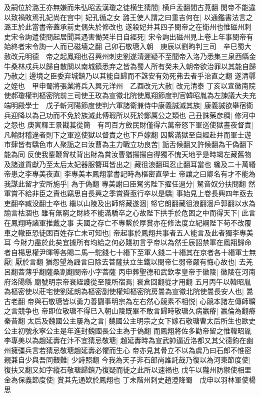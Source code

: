 及嗣位於潞王亦無嫌而朱弘昭孟漢瓊之徒横生猜間|{
	横戶孟翻間古莧翻}
閔帝不能違以致禍敗焉孔妃尚在宫中|{
	妃孔循之女}
潞王使人謂之曰重吉何在|{
	以通鑑書法言之潞王於此當書帝蓋承前史偶失於修改也}
遂殺妃并其四子閔帝之在衛州也惟磁州刺史宋令詢遣使問起居聞其遇害慟哭半日自經死|{
	宋令詢出磁州見上卷上年事閔帝有始終者宋令詢一人而已磁墻之翻}
己卯石敬瑭入朝　庚辰以劉昫判三司　辛巳蜀大赦改元明德　帝之起鳳翔也召興州刺史劉遂清遲疑不至聞帝入洛乃悉集三泉西縣金牛桑林戍兵以歸自散關以南城鎮悉弃之皆為蜀人所有癸未入朝帝欲治罪以其能自歸乃赦之|{
	邊境之臣委弃城鎮乃以其能自歸而不誅安有効死弗去者乎治直之翻}
遂清鄩之姪也　甲申蜀將張業將兵入興元洋州　乙酉改元大赦|{
	改元清泰}
丁亥以宣徽南院使郝瓊權判樞密院前三司使王玫為宣徽北院使鳳翔節度判官韓昭胤為左諫議大夫充端明殿學士　戊子斬河陽節度使判六軍諸衛兼侍中康義誠滅其族|{
	康義誠欲舉宿衛兵迎降以為己功而不免於族滅此傅瑕所以死於鄭厲公之類也}
己丑誅藥彦稠|{
	修河中之怨也}
庚寅釋王景戡萇從簡　有司百方斂民財僅得六萬帝怒下軍巡使獄晝夜督責|{
	凡輸財稽違者則下之軍巡使獄以督責之也下戶嫁翻}
囚繫滿獄至自經赴井而軍士遊市肆皆有驕色市人聚詬之曰汝曹為主力戰立功良苦|{
	詬舌候翻又許候翻為干偽翻下能為同}
反使我輩鞭胷杖背出財為賞汝曹猶揚揚自得獨不愧天地乎是時竭左藏舊物及諸道貢獻乃至太后太妃器服簪珥皆出之|{
	藏徂浪翻珥忍止翻耳當也}
纔及二十萬緡帝患之李專美夜直|{
	李專美本鳳翔掌書記時為樞密直學士}
帝讓之曰卿名有才不能為我謀此留才安所施乎|{
	為于偽翻}
專美謝曰臣駑劣陛下擢任過分|{
	駑音奴分扶問翻}
然軍賞不給非臣之責也竊思自長興之季賞賚亟行卒以是驕|{
	事始見上卷長興四年亟去吏翻卒臧没翻士卒也}
繼以山陵及出師帑藏遂涸|{
	帑它朗翻藏徂浪翻涸戶郭翻以水為諭言枯涸也}
雖有無窮之財終不能滿驕卒之心故陛下拱手於危困之中而得天下|{
	此言在鳳翔時諸軍推戴之事}
夫國之存亡不專繫於厚賞亦在修法度立紀綱陛下苟不改覆車之轍臣恐徒困百姓存亡未可知也|{
	帝起事於鳳翔共事者五人能言及此者獨李專美耳}
今財力盡於此矣宜據所有均給之何必踐初言乎帝以為然壬辰詔禁軍在鳳翔歸命者自楊思權尹暉等各賜二馬一駝錢七十緡下至軍人錢二十緡其在京者各十緡軍士無厭|{
	厭於言翻}
猶怨望為謡言曰除去菩薩扶立生鐵以閔帝仁弱帝嚴有悔心故也|{
	去羌呂翻菩薄乎翻薩桑割翻閔帝小字菩薩}
丙申葬聖德和武欽孝皇帝于徽陵|{
	徽陵在河南府洛陽縣}
廟號明宗帝衰絰護從至陵所宿焉|{
	衰倉回翻從才用翻}
五月丙午以韓昭胤為樞密使以莊宅使劉延朗為樞密副使權知樞密院房暠為宣徽北院使暠長安人也|{
	暠古老翻}
帝與石敬瑭皆以勇力善闘事明宗為左右然心競素不相悦|{
	心競本諸左傳師曠之言競争也}
帝即位敬瑭不得已入朝山陵既畢不敢言歸時敬瑭久病羸瘠|{
	羸倫為翻瘠秦昔翻}
太后及魏國公主屢為之言|{
	魏國公主明宗之女下嫁石敬瑭曹太后所生也歐史公主初號永寧公主是年進封魏國長公主為于偽翻}
而鳳翔將佐多勸帝留之惟韓昭胤李專美以為趙延壽在汴不宜猜忌敬瑭|{
	趙延夀時為宣武帥逼近洛都又其父德鈞在幽州擁彊兵言若猜忌敬瑭趙延壽必懼而生心}
帝亦見其骨立不以為虞乃曰石郎不惟密親兼自少與吾同艱難|{
	少詩照翻}
今我為天子非石郎尚誰託哉乃復以為河東節度使|{
	復扶又翻又如字縱石敬瑭歸鎮乃復疑而徙之此所以速禍也}
戊午以隴州防禦使相里金為保義節度使|{
	賞其先通欵於鳳翔也}
丁未階州刺史趙澄降蜀　戊申以羽林軍使楊思

